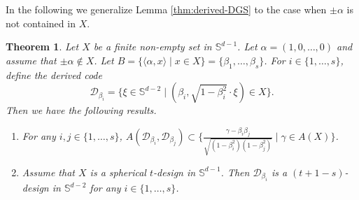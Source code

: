 \documentclass[11pt]{article}
\newtheorem{theorem}{Theorem}[section]
\theoremstyle{definition}
\theoremstyle{remark}
\begin{document}
In the following we generalize Lemma \ref{thm:derived-DGS} to the case when $\pm\alpha$ is not contained in $X$.  

\begin{theorem}\label{thm:derived}
Let $X$ be a finite non-empty set in $\mathbb{S}^{d-1}$. 
Let $\alpha=(1,0,\ldots,0)$ and assume that $\pm\alpha\not\in X$. 
Let $B=\{\langle \alpha ,x\rangle \mid x\in X\}=\{\beta_1,\ldots,\beta_s\}$. 
For $i\in \{1,\ldots,s\}$, define the derived code
\begin{equation*}
\mathcal{D}_{\beta_i}=\Big\{\xi\in \mathbb{S}^{d-2} \mid (\beta_i,\sqrt{1-\beta_i^2}\cdot \xi)\in X\Big\}.
\end{equation*}
Then we have the following results.
\begin{enumerate}
\item[\rm (i)] For any $i,j\in\{1,\ldots,s\}$, $A(\mathcal{D}_{\beta_i},\mathcal{D}_{\beta_j})\subset \Big\{\frac{\gamma-\beta_i \beta_j}{\sqrt{(1-\beta_i^2)(1-\beta_j^2)}} \mid \gamma\in A(X)\Big\}$.
\item[\rm (ii)] Assume that $X$ is a spherical $t$-design in $\mathbb{S}^{d-1}$. 
Then $\mathcal{D}_{\beta_i}$ is a $(t+1-s)$-design in $\mathbb{S}^{d-2}$ for any $i\in \{1,\ldots,s\}$. 
\end{enumerate}
\end{theorem}
\end{document}
